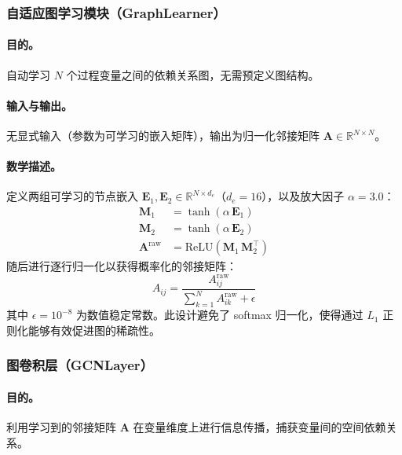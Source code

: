 \documentclass[UTF8]{ctexart}
\begin{document}
\subsubsection{自适应图学习模块（GraphLearner）}

\paragraph{目的。}
自动学习 $N$ 个过程变量之间的依赖关系图，无需预定义图结构。

\paragraph{输入与输出。}
无显式输入（参数为可学习的嵌入矩阵），输出为归一化邻接矩阵 $\mathbf{A} \in \mathbb{R}^{N \times N}$。

\paragraph{数学描述。}
定义两组可学习的节点嵌入 $\mathbf{E}_1, \mathbf{E}_2 \in \mathbb{R}^{N \times d_e}$（$d_e=16$），以及放大因子 $\alpha=3.0$：
\begin{align}
    \mathbf{M}_1 &= \tanh(\alpha \, \mathbf{E}_1) \\
    \mathbf{M}_2 &= \tanh(\alpha \, \mathbf{E}_2) \\
    \mathbf{A}^{\text{raw}} &= \mathrm{ReLU}\!\left(\mathbf{M}_1 \, \mathbf{M}_2^\top\right)
\end{align}
随后进行逐行归一化以获得概率化的邻接矩阵：
\begin{equation}
    A_{ij} = \frac{A_{ij}^{\text{raw}}}{\sum_{k=1}^{N} A_{ik}^{\text{raw}} + \epsilon}
\end{equation}
其中 $\epsilon = 10^{-8}$ 为数值稳定常数。此设计避免了 softmax 归一化，使得通过 $L_1$ 正则化能够有效促进图的稀疏性。

\subsubsection{图卷积层（GCNLayer）}

\paragraph{目的。}
利用学习到的邻接矩阵 $\mathbf{A}$ 在变量维度上进行信息传播，捕获变量间的空间依赖关系。
\end{document}
